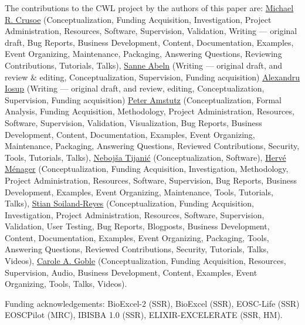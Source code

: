 \documentclass[sigconf,authordraft]{acmart}
\begin{document}
\begin{acks}
The contributions to the CWL project by the authors of this paper are:
\href{https://orcid.org/0000-0002-2961-9670}{Michael R. Crusoe} (Conceptualization, Funding Acquisition, Investigation, Project Administration, Resources, Software, Supervision, Validation, Writing --- original draft, Bug Reports, Business Development, Content, Documentation, Examples, Event Organizing, Maintenance, Packaging, Answering Questions, Reviewing Contributions, Tutorials, Talks),
\href{https://orcid.org/0000-0002-2779-7174}{Sanne Abeln} (Writing --- original draft, and review \& editing, Conceptualization, Supervision, Funding acquisition)
\href{https://orcid.org/0000-0001-8030-9398}{Alexandru Iosup} (Writing --- original draft, and review, editing, Conceptualization, Supervision, Funding acquisition)
\href{https://orcid.org/0000-0003-3566-7705}{Peter Amstutz} (Conceptualization, Formal Analysis, Funding Acquisition, Methodology, Project Administration, Resources, Software, Supervision, Validation, Visualization, Bug Reports, Business Development, Content, Documentation, Examples, Event Organizing, Maintenance, Packaging, Answering Questions, Reviewed Contributions, Security, Tools, Tutorials, Talks),
\href{https://orcid.org/0000-0001-8316-4067}{Nebojša Tijanić} (Conceptualization, Software),
\href{https://orcid.org/0000-0002-7552-1009}{Hervé Ménager} (Conceptualization, Funding Acquisition, Investigation, Methodology, Project Administration, Resources, Software, Supervision, Bug Reports, Business Development, Examples, Event Organizing, Maintenance, Tools, Tutorials, Talks),
\href{https://orcid.org/0000-0001-9842-9718}{Stian Soiland-Reyes} (Conceptualization, Funding Acquisition, Investigation, Project Administration, Resources, Software, Supervision, Validation, User Testing, Bug Reports, Blogposts, Business Development, Content, Documentation, Examples, Event Organizing, Packaging, Tools, Answering Questions, Reviewed Contributions, Security, Tutorials, Talks, Videos),
\href{https://orcid.org/0000-0003-1219-2137}{Carole A. Goble} (Conceptualization, Funding Acquisition, Resources, Supervision, Audio, Business Development, Content, Examples, Event Organizing, Tools, Talks, Videos).

Funding acknowledgements: 
 BioExcel-2 (SSR),
 BioExcel (SSR),
 EOSC-Life
(SSR)
 EOSCPilot (MRC),
 IBISBA 1.0 (SSR),
 ELIXIR-EXCELERATE (SSR, HM).
\end{acks}




\end{document}

